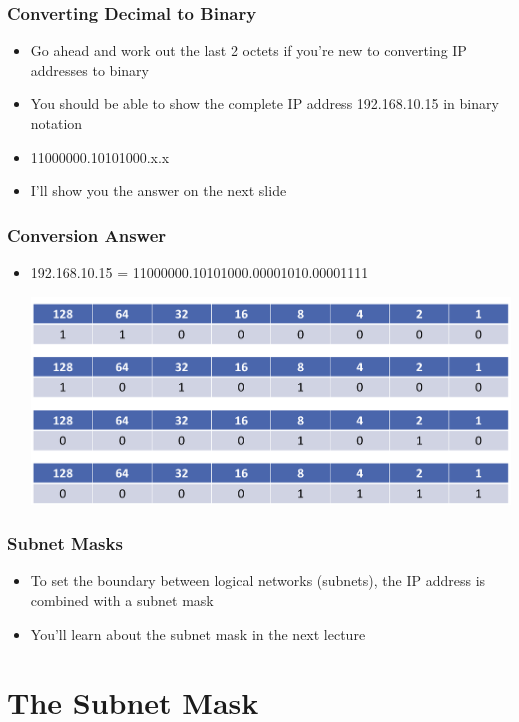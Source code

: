 \documentclass[pdflatex,compress]{beamer}
\begin{document}
\begin{frame}
	\frametitle{Converting Decimal to Binary}
	\begin{itemize}
		\item Go ahead and work out the last 2 octets if you’re new to converting IP addresses to binary
		\item You should be able to show the complete IP address 192.168.10.15 in binary notation
		\item 11000000.10101000.x.x
		\item I’ll show you the answer on the next slide
	\end{itemize}	
\end{frame}

\begin{frame}
	\frametitle{Conversion Answer}
	\begin{itemize}
		\item 192.168.10.15 = 11000000.10101000.00001010.00001111
		\begin{center}
			\includegraphics[width=\linewidth]{img/img22}
		\end{center}
	\end{itemize}
\end{frame}

\begin{frame}
	\frametitle{Subnet Masks}
	\begin{itemize}
		\item To set the boundary between logical networks (subnets), the IP address is combined with a subnet mask
		\item You’ll learn about the subnet mask in the next lecture
	\end{itemize}
\end{frame}

\section{The Subnet Mask}
\end{document}
